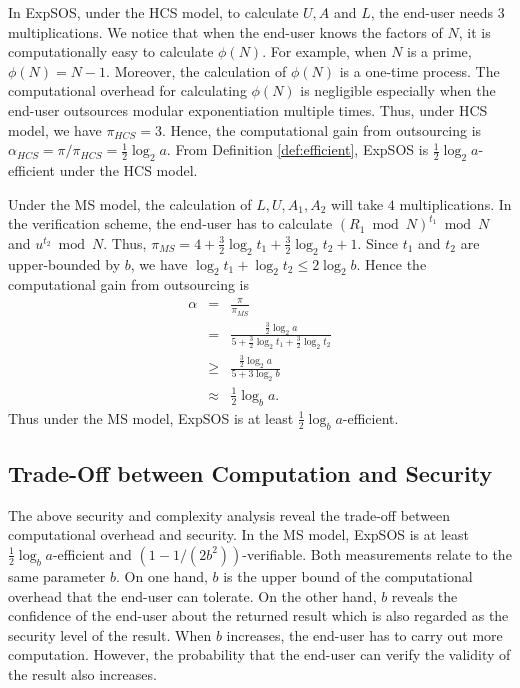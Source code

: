 \documentclass[english,draftcls,onecolumn,11pt]{IEEEtran}
\theoremstyle{definition}
\theoremstyle{plain}
\theoremstyle{plain}
\theoremstyle{definition}
\begin{document}
In ExpSOS, under the HCS model, to calculate $U,A$ and $L$, the
end-user needs $3$ multiplications. We notice that when the end-user
knows the factors of $N$, it is computationally easy to calculate
$\phi(N)$. For example, when $N$ is a prime, $\phi(N)=N-1$. Moreover,
the calculation of $\phi(N)$ is a one-time process. The computational
overhead for calculating $\phi(N)$ is negligible especially when
the end-user outsources modular exponentiation multiple times. Thus,
under HCS model, we have $\pi_{HCS}=3$. Hence, the computational
gain from outsourcing is $\alpha_{HCS}=\pi/\pi_{HCS}=\frac{1}{2}\log_{2}a$.
From Definition \ref{def:efficient}, ExpSOS is $\frac{1}{2}\log_{2}a$-efficient
under the HCS model. 

Under the MS model, the calculation of $L,U,A_{1},A_{2}$ will take
$4$ multiplications. In the verification scheme, the end-user has
to calculate $(R_{1}\bmod N)^{t_{1}}\bmod N$ and $u^{t_{2}}\bmod N$.
Thus, $\pi_{MS}=4+\frac{3}{2}\log_{2}t_{1}+\frac{3}{2}\log_{2}t_{2}+1$.
Since $t_{1}$ and $t_{2}$ are upper-bounded by $b$, we have $\log_{2}t_{1}+\log_{2}t_{2}\leq2\log_{2}b$.
Hence the computational gain from outsourcing is 
\[
{\displaystyle \begin{array}{rcl}
\alpha & = & {\displaystyle \frac{\pi}{\pi_{MS}}}\\
 & = & {\displaystyle \frac{\frac{3}{2}\log_{2}a}{5+\frac{3}{2}\log_{2}t_{1}+\frac{3}{2}\log_{2}t_{2}}}\\
 & \geq & {\displaystyle \frac{\frac{3}{2}\log_{2}a}{5+3\log_{2}b}}\\
 & \approx & {\displaystyle \frac{1}{2}\log_{b}a}.
\end{array}}
\]
 Thus under the MS model, ExpSOS is at least $\frac{1}{2}\log_{b}a$-efficient. 


\subsection{Trade-Off between Computation and Security}

The above security and complexity analysis reveal the trade-off between
computational overhead and security. In the MS model, ExpSOS is at
least $\frac{1}{2}\log_{b}a$-efficient and $(1-1/(2b^{2}))$-verifiable.
Both measurements relate to the same parameter $b$. On one hand,
$b$ is the upper bound of the computational overhead that the end-user
can tolerate. On the other hand, $b$ reveals the confidence of the
end-user about the returned result which is also regarded as the security
level of the result. When $b$ increases, the end-user has to carry
out more computation. However, the probability that the end-user can
verify the validity of the result also increases. 
\end{document}
